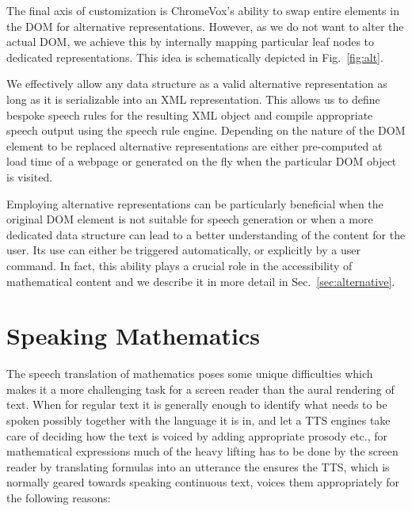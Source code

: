 \documentclass{sig-alternate}
\begin{document}
The final axis of customization is ChromeVox's ability to swap entire elements
in the DOM for alternative representations. However, as we do not want to alter
the actual DOM, we achieve this by internally mapping particular leaf nodes to
dedicated representations. This idea is schematically depicted in
Fig.~\ref{fig:alt}.


We effectively allow any data structure as a valid alternative representation as
long as it is serializable into an XML representation. This allows us to define
bespoke speech rules for the resulting XML object and compile appropriate
speech output using the speech rule engine. Depending on the nature of the DOM
element to be replaced alternative representations are either pre-computed at
load time of a webpage or generated on the fly when the particular DOM object is
visited.

Employing alternative representations can be particularly beneficial when the
original DOM element is not suitable for speech generation or when a more
dedicated data structure can lead to a better understanding of the content
for the user. Its use can either be triggered automatically, or explicitly by a
user command. In fact, this ability plays a crucial role in the accessibility of
mathematical content and we describe it in more detail in
Sec.~\ref{sec:alternative}.


\section{Speaking Mathematics}
\label{sec:translate}

The speech translation of mathematics poses some unique difficulties which makes
it a more challenging task for a screen reader than the aural
rendering of text. When for regular text it is generally enough to identify what
needs to be spoken possibly together with the language it is in, and let a TTS
engines take care of deciding how the text is voiced by adding appropriate
prosody etc., for mathematical expressions much of the heavy lifting has to be
done by the screen reader by translating formulas into an utterance the ensures
the TTS, which is normally geared towards speaking continuous text, voices them
appropriately for the following reasons:
\end{document}
